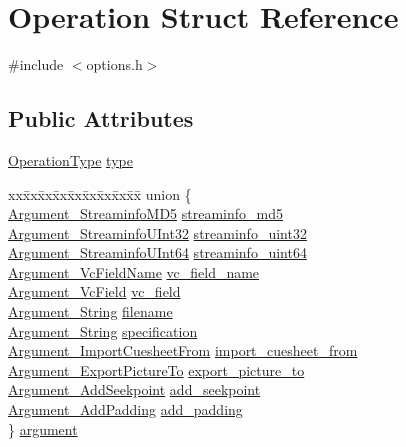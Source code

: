\hypertarget{struct_operation}{}\section{Operation Struct Reference}
\label{struct_operation}


{\ttfamily \#include $<$options.\+h$>$}

\subsection*{Public Attributes}
\begin{DoxyCompactItemize}
\item 
\hyperlink{libflac_2src_2metaflac_2options_8h_a9a2c9c31d675b34f6ec35cc1ca89e047}{Operation\+Type} \hyperlink{struct_operation_aaea1a894581fa1c08b17b7b52c0699f8}{type}
\item 
\begin{tabbing}
xx\=xx\=xx\=xx\=xx\=xx\=xx\=xx\=xx\=\kill
union \{\\
\>\hyperlink{struct_argument___streaminfo_m_d5}{Argument\_StreaminfoMD5} \hyperlink{struct_operation_acb48606ed3626e6ab9248cffb86d38c8}{streaminfo\_md5}\\
\>\hyperlink{struct_argument___streaminfo_u_int32}{Argument\_StreaminfoUInt32} \hyperlink{struct_operation_abd9f32311368134f41692f987db05687}{streaminfo\_uint32}\\
\>\hyperlink{struct_argument___streaminfo_u_int64}{Argument\_StreaminfoUInt64} \hyperlink{struct_operation_aaa0e0d75a9619c74b6a310047b0dbc9b}{streaminfo\_uint64}\\
\>\hyperlink{struct_argument___vc_field_name}{Argument\_VcFieldName} \hyperlink{struct_operation_abb88b3ad8d27c0e9c58a24e4d57f2c34}{vc\_field\_name}\\
\>\hyperlink{struct_argument___vc_field}{Argument\_VcField} \hyperlink{struct_operation_aa0e67833b11d5ac5f1f2e10d6256e36b}{vc\_field}\\
\>\hyperlink{struct_argument___string}{Argument\_String} \hyperlink{struct_operation_a08307a512df95f8430e3607a50185e59}{filename}\\
\>\hyperlink{struct_argument___string}{Argument\_String} \hyperlink{struct_operation_a54b391a42469bb351257aed334a7afdb}{specification}\\
\>\hyperlink{struct_argument___import_cuesheet_from}{Argument\_ImportCuesheetFrom} \hyperlink{struct_operation_a6a4d77c3bf15de1da6d494574d9d2e1e}{import\_cuesheet\_from}\\
\>\hyperlink{struct_argument___export_picture_to}{Argument\_ExportPictureTo} \hyperlink{struct_operation_af11305f7fbb4bef10adcf7dfb7db5cd5}{export\_picture\_to}\\
\>\hyperlink{struct_argument___add_seekpoint}{Argument\_AddSeekpoint} \hyperlink{struct_operation_abb3b6aab9b60a48c75fec2c366053f8f}{add\_seekpoint}\\
\>\hyperlink{struct_argument___add_padding}{Argument\_AddPadding} \hyperlink{struct_operation_a4ae2e779c7d818bdc3752a235b576e21}{add\_padding}\\
\} \hyperlink{struct_operation_a1e7b272c2e26a7ef9ab0b3d01005182b}{argument}\\


\end{tabbing}
\end{DoxyCompactItemize}
